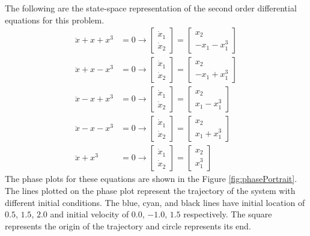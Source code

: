 \documentclass[14pt, a4paper]{extreport}
\begin{document}
The following are the state-space representation of the second order differential equations for this problem.
%
\begin{align}
\ddot{x} + x + x^3 &= 0 \longrightarrow
\begin{bmatrix}
	\dot{x}_1 \\
	\dot{x}_2
\end{bmatrix} = 
\begin{bmatrix}
	x_2 \\
	-x_1 - x_1^3
\end{bmatrix} \\
\ddot{x} + x - x^3 &= 0 \longrightarrow
\begin{bmatrix}
	\dot{x}_1 \\
	\dot{x}_2
\end{bmatrix} = 
\begin{bmatrix}
	x_2 \\
	-x_1 + x_1^3
\end{bmatrix} \\
\ddot{x} - x + x^3 &= 0 \longrightarrow
\begin{bmatrix}
	\dot{x}_1 \\
	\dot{x}_2
\end{bmatrix} = 
\begin{bmatrix}
	x_2 \\
	x_1 - x_1^3
\end{bmatrix} \\
\ddot{x} - x - x^3 &= 0 \longrightarrow
\begin{bmatrix}
	\dot{x}_1 \\
	\dot{x}_2
\end{bmatrix} = 
\begin{bmatrix}
	x_2 \\
	x_1 + x_1^3
\end{bmatrix} \\
\ddot{x} + x^3 &= 0 \longrightarrow
\begin{bmatrix}
	\dot{x}_1 \\
	\dot{x}_2
\end{bmatrix} = 
\begin{bmatrix}
	x_2 \\
	x_1^3
\end{bmatrix}
\end{align}
%
The phase plots for these equations are shown in the Figure \ref{fig:phasePortrait}. The lines plotted on the phase plot represent the trajectory of the system with different initial conditions. The blue, cyan, and black lines have initial location of $0.5$, $1.5$, $2.0$ and initial velocity of $0.0$, $-1.0$, $1.5$ respectively. The square represents the origin of the trajectory and circle represents its end. 
\end{document}
